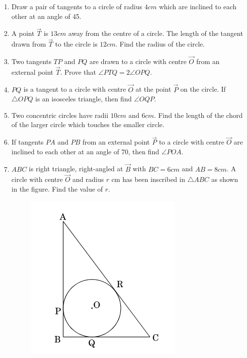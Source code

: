 \begin{enumerate}
\begin{figure}[!htb]
		\caption{}
		\label{fig:circ-1}
	\end{figure}
	\item Draw a pair of tangents to a circle of radius $4 cm$ which are inclined to each other at an angle of 45\degree.	
	\item A point $\vec{T}$ is $13 cm$ away from the centre of a circle. The length of the tangent drawn from $\vec{T}$ to the circle is $12 cm$. Find the radius of the circle.
	\item Two tangents $TP$ and $PQ$ are drawn to a circle with centre $\vec{O}$ from an external point $\vec{T}$. Prove that $\angle PTQ = 2 \angle OPQ$.
	\item $PQ$ is a tangent to a circle with centre $\vec{O}$ at the point $\vec{P}$ on the circle. If $\triangle OPQ$ is an isosceles triangle, then find $\angle OQP$.
	\item Two concentric circles have radii $10 cm$ and $6 cm$. Find the length of the chord of the larger circle which touches the smaller circle.
	\item If tangents $PA$ and $PB$ from an external point $\vec{P}$ to a circle with centre $\vec{O}$ are inclined to each other at an angle of 70\degree, then find $\angle POA$.
	\item $ABC$ is right triangle, right-angled at $\vec{B}$ with $BC = 6 cm$ and $AB = 8 cm$. A circle with centre $\vec{O}$ and radius $r$ cm has been inscribed in $\triangle ABC$ as shown in the figure. Find the value of $r$.
		\begin{figure}[H]
			\centering
			\includegraphics[width=\columnwidth]{figs/circ-2.png}

\end{figure}
\end{enumerate}
